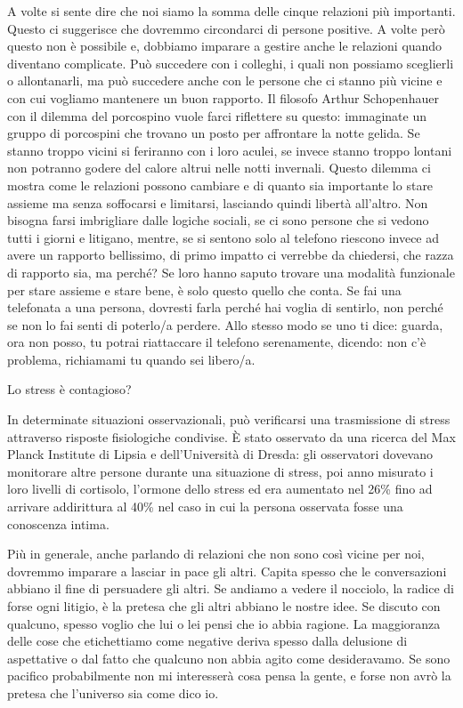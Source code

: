 \documentclass[12pt]{book} %
\begin{document}
A volte si sente dire che noi siamo la somma delle cinque relazioni più importanti. Questo ci suggerisce che dovremmo
circondarci di persone positive. A volte però questo non è possibile e, dobbiamo imparare a gestire anche le relazioni
quando diventano complicate. Può succedere con i colleghi, i quali non possiamo sceglierli o allontanarli, ma può
succedere anche con le persone che ci stanno più vicine e con cui vogliamo mantenere un buon rapporto. Il filosofo
Arthur Schopenhauer con il dilemma del porcospino vuole farci riflettere su questo: immaginate un gruppo di porcospini
che trovano un posto per affrontare la notte gelida. Se stanno troppo vicini si feriranno con i loro aculei, se invece
stanno troppo lontani non potranno godere del calore altrui nelle notti invernali. Questo dilemma ci mostra come le
relazioni possono cambiare e di quanto sia importante lo stare assieme ma senza soffocarsi e limitarsi, lasciando
quindi libertà all'altro. Non bisogna farsi imbrigliare dalle logiche sociali, se ci sono persone
che si vedono tutti i giorni e litigano, mentre, se si sentono solo al telefono riescono invece ad avere un rapporto
bellissimo, di primo impatto ci verrebbe da chiedersi, che razza di rapporto sia, ma perché? Se loro hanno saputo
trovare una modalità funzionale per stare assieme e stare bene, è solo questo quello che conta. Se fai una telefonata a
una persona, dovresti farla perché hai voglia di sentirlo, non perché se non lo fai senti di poterlo/a perdere.
Allo stesso modo se uno ti dice: guarda, ora non posso, tu potrai riattaccare il telefono serenamente, dicendo: non c'è
problema, richiamami tu quando sei libero/a.

\begin{mdframed}[linewidth=1pt]
Lo stress è contagioso?

In determinate situazioni osservazionali, può verificarsi una trasmissione di stress attraverso risposte fisiologiche condivise. È stato osservato da una ricerca del Max Planck Institute di Lipsia e dell'Università di
Dresda: gli osservatori dovevano monitorare altre persone durante una situazione di stress, poi anno misurato i loro livelli
di cortisolo, l'ormone dello stress ed era aumentato nel 26\% fino ad arrivare addirittura al 40\% nel caso in cui la
persona osservata fosse una conoscenza intima.
\end{mdframed}

Più in generale, anche parlando di relazioni che non sono così vicine per noi, dovremmo imparare a lasciar in pace gli
altri. Capita spesso che le conversazioni abbiano il fine di persuadere gli altri. Se andiamo a vedere il nocciolo, la radice di forse ogni litigio, è la pretesa che gli altri abbiano le nostre idee.
Se discuto con qualcuno, spesso voglio che lui o lei pensi che io abbia ragione.
La maggioranza delle cose che etichettiamo come negative deriva spesso dalla delusione di aspettative o dal fatto che qualcuno non abbia agito come desideravamo. Se sono pacifico probabilmente non mi interesserà cosa pensa la gente, e forse non avrò la pretesa che l'universo sia come dico io.
\end{document}
